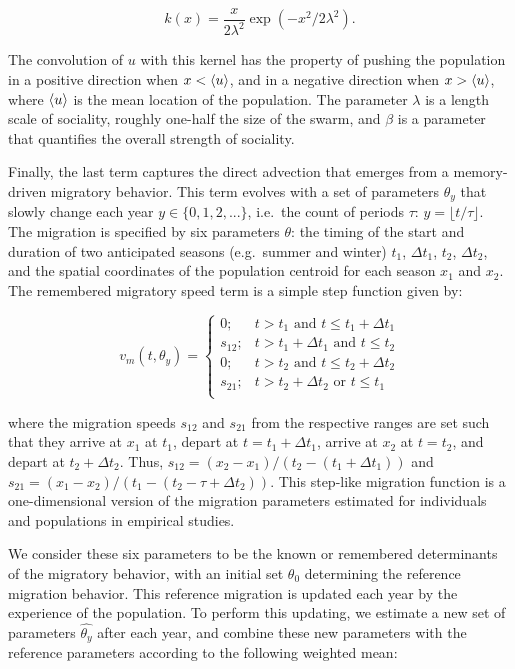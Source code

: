 \documentclass[utf8]{frontiersSCNS} %
\begin{document}
	$$k(x) = \frac{x}{2\lambda^2} \exp(-x^2/2\lambda^2).$$ 
	
	\noindent The convolution of $u$ with this kernel has the property of pushing the population in a positive direction when $x < \braket{u}$, and in a negative direction when $x > \braket{u}$, where $\braket{u}$ is the mean location of the population. The parameter $\lambda$ is a length scale of sociality, roughly one-half the size of the swarm, and $\beta$ is a parameter that quantifies the overall strength of sociality.
	
	Finally, the last term captures the direct advection that emerges from a memory-driven migratory behavior. This term evolves with a set of parameters $\theta_y$ that slowly change each year $y \in \{0,1,2,...\}$, i.e.~the count of periods $\tau$: $y = \lfloor t/\tau \rfloor$.  The migration is specified by six parameters $\theta$: the timing of the start and duration of two anticipated seasons (e.g.~summer and winter) $t_1$, $\Delta t_1$, $t_2$, $\Delta t_2$, and the spatial coordinates of the population centroid for each season $x_1$ and $x_2$. The remembered migratory speed term is a simple step function given by:
	
	\begin{equation}
		v_m(t, \theta_y) = \begin{cases}
			0; & t > t_1  \,\, \text{and} \,\, t \leq t_1 + \Delta t_1 \\ 
			s_{12}; & t > t_1 + \Delta t_1 \,\, \text{and} \,\,  t \leq t_2 \\ 
			0; & t> t_2 \,\, \text{and} \,\, t \leq t_2 + \Delta t_2 \\ 
			s_{21}; &  t > t_2+\Delta t_2 \,\, \text{or} \,\, t \leq t_1\\ 
		\end{cases}
	\end{equation}
	
	\noindent where the migration speeds $s_{12}$ and $s_{21}$ from the respective ranges are set such that they arrive at $x_1$ at $t_1$, depart at $t = t_1 + \Delta t_1$, arrive at $x_2$ at $t = t_2$, and depart at $t_2 + \Delta t_2$. Thus, $s_{12} = (x_2-x_1)/ (t_2 - (t_1 + \Delta t_1))$ and $s_{21} = (x_1-x_2)/(t_1 - (t_2 - \tau + \Delta t_2))$. This step-like migration function is a one-dimensional version of the migration parameters estimated for individuals \citep{Gurarie2017} and populations \citep{Gurarie2019} in empirical studies.
	
	We consider these six parameters to be the known or remembered determinants of the migratory behavior, with an initial set $\theta_0$ determining the reference migration behavior. This reference migration is updated each year by the experience of the population. To perform this updating, we estimate a new set of parameters $\widehat{\theta_y}$ after each year, and combine these new parameters with the reference parameters according to the following weighted mean:
	
\end{document}

